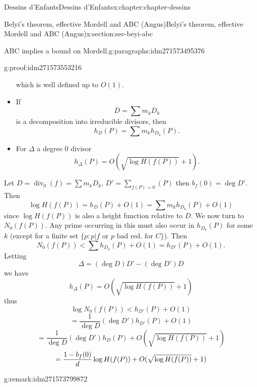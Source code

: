 \documentclass[oneside,10pt,]{book}
\newcommand{\qedhere}{\relax}
\numberwithin{equation}{section}
\DeclareMathOperator{\divisor}{div}
\newcommand{\lt}{<}
\begin{document}
\begin{chapterptx}{Dessins d'Enfants}{}{Dessins d'Enfants}{}{}{x:chapter:chapter-dessins}
\begin{sectionptx}{Belyi's theorem, effective Mordell and ABC (Angus)}{}{Belyi's theorem, effective Mordell and ABC (Angus)}{}{}{x:section:sec-beyi-abc}
\begin{paragraphs}{ABC implies a bound on Mordell.}{g:paragraphs:idm271573495376}
\begin{proofptx}{}{g:proof:idm271573553216}
\begin{itemize}[label=\textbullet]
which is well defined up to  \(O(1)\).%
\item{}If%
\begin{equation*}
D=  \sum m_k D_k
\end{equation*}
is a decomposition into irreducible divisors, then%
\begin{equation*}
h_D(P) = \sum m_k h_{D_k}(P)\text{.}
\end{equation*}
%
\item{}For \(\Delta\) a degree 0 divisor%
\begin{equation*}
h_{\Delta} (P) = O(\sqrt{\log H(f(P))} + 1)\text{.}
\end{equation*}
%
\end{itemize}
%
\par
Let \(D = \divisor_0(f) = \sum m_k D_k\), \(D' = \sum_{f(P) = 0} (P)\) then \(b_f(0) = \deg D'\). Then%
\begin{equation*}
\log H(f(P)) = h_D(P) + O(1) = \sum m_k h_{D_k}(P) + O(1)
\end{equation*}
since \(\log H(f(P))\) is also a height function relative to \(D\). We now turn to \(N_0(f(P))\). Any prime occurring in this must also occur in \(h_{D_k}(P)\) for some \(k\) (except for a finite set \(\{p : p|f \text{ or } p \text{ bad red. for } C\}\)). Then%
\begin{equation*}
N_0(f(P))  \lt \sum h_{D_k}(P) + O(1) = h_{D'}(P) + O(1)\text{.}
\end{equation*}
Letting%
\begin{equation*}
\Delta = (\deg D) D' - (\deg D') D
\end{equation*}
we have%
\begin{equation*}
h_{\Delta} (P) = O(\sqrt{\log H(f(P))} + 1)
\end{equation*}
thus%
\begin{equation*}
\log N_0(f(P)) \lt h_{D'} (P) + O(1)
\end{equation*}
%
\begin{equation*}
= \frac{1}{\deg D} (\deg D') h_{D'} (P) + O(1)
\end{equation*}
%
\begin{equation*}
= \frac{1}{\deg D} (\deg D') h_{D} (P) + O(\sqrt{\log H(f(P))} + 1)
\end{equation*}
%
\begin{equation*}
= \frac{1- b_f(0)}{d} \log  H(f(P)) + O(\sqrt{\log H(f(P))} + 1)\qedhere
\end{equation*}
%
\end{proofptx}
\begin{remark}{}{g:remark:idm271573799872}%

\end{remark}
\end{paragraphs}
\end{sectionptx}
\end{chapterptx}
\end{document}
